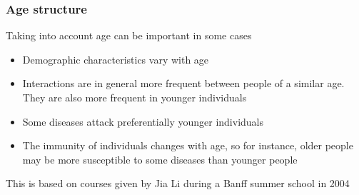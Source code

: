 \documentclass[aspectratio=169]{beamer}\usepackage[]{graphicx}\usepackage[]{xcolor}
\begin{document}
\begin{frame} 
\end{frame}




\begin{frame}\frametitle{Age structure}
Taking into account age can be important in some cases
\vfill
\begin{itemize}
\item Demographic characteristics vary with age
\item Interactions are in general more frequent between people of a similar age. They are also more frequent in younger individuals
\item Some diseases attack preferentially younger individuals
\item The immunity of individuals changes with age, so for instance, older people may be more susceptible to some diseases than younger people
\end{itemize}
\vfill
This is based on courses given by Jia Li during a Banff summer school in 2004
\end{frame}
\end{document}
